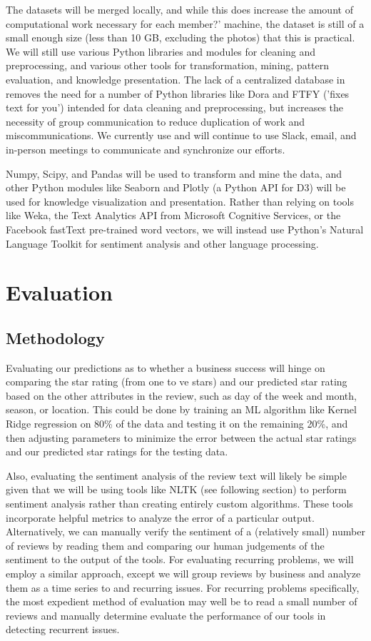 \quad The datasets will be merged locally, and while this does increase the amount of computational work necessary for each member?' machine, the dataset is still of a small enough size (less than 10 GB, excluding the photos) that this is practical. We will still use various Python libraries and modules for cleaning and preprocessing, and various other tools for transformation, mining, pattern evaluation, and knowledge presentation. The lack of a centralized database in removes the need for a number of Python libraries like Dora and FTFY ('fixes text for you') intended for data cleaning and preprocessing, but increases the necessity of group communication to reduce duplication of work and miscommunications. We currently use and will continue to use Slack, email, and in-person meetings to communicate and synchronize our efforts. 

\quad Numpy, Scipy, and Pandas will be used to transform and mine the data, and other Python modules like Seaborn and Plotly (a Python API for D3) will be used for knowledge visualization and presentation. Rather than relying on tools like Weka, the Text Analytics API from Microsoft Cognitive Services, or the Facebook fastText pre-trained word vectors, we will instead use Python's Natural Language Toolkit for sentiment analysis and other language processing.

\section{Evaluation}

\subsection{Methodology}

\quad Evaluating our predictions as to whether a business success will hinge on comparing the star rating (from one to  ve stars) and our predicted star rating based on the other attributes in the review, such as day of the week and month, season, or location. This could be done by training an ML algorithm like Kernel Ridge regression on 80\% of the data and testing it on the remaining 20\%, and then adjusting parameters to minimize the error between the actual star ratings and our predicted star ratings for the testing data.

\quad Also, evaluating the sentiment analysis of the review text will likely be simple given that we will be using tools like NLTK (see following section) to perform sentiment analysis rather than creating entirely custom algorithms. These tools incorporate helpful metrics to analyze the error of a particular output. Alternatively, we can manually verify the sentiment of a (relatively small) number of reviews by reading them and comparing our human judgements of the sentiment to the output of the tools. For evaluating recurring problems, we will employ a similar approach, except we will group reviews by business and analyze them as a time series to and recurring issues. For recurring problems specifically, the most expedient method of evaluation may well be to read a small number of reviews and manually determine evaluate the performance of our tools in detecting recurrent issues.

